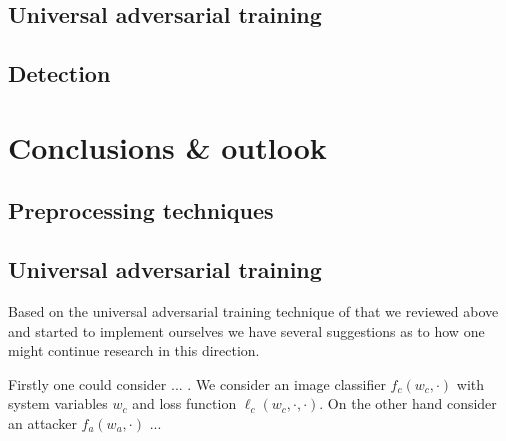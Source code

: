 \documentclass[12pt]{article}
\begin{document}
\subsection{Universal adversarial training}

\subsection{Detection}

\section{Conclusions \& outlook}

\subsection{Preprocessing techniques}

\subsection{Universal adversarial training}

Based on the universal adversarial training technique of \cite{shafahi_universal_2018} that we reviewed above and started to implement ourselves we have several suggestions as to how one might continue research in this direction. 

Firstly one could consider ... . We consider an image classifier $f_c(w_c,\cdot)$ with system variables $w_c$ and loss function $\ell_c(w_c, \cdot, \cdot)$. On the other hand consider an attacker $f_a(w_a,\cdot)$ ... 
\end{document}
